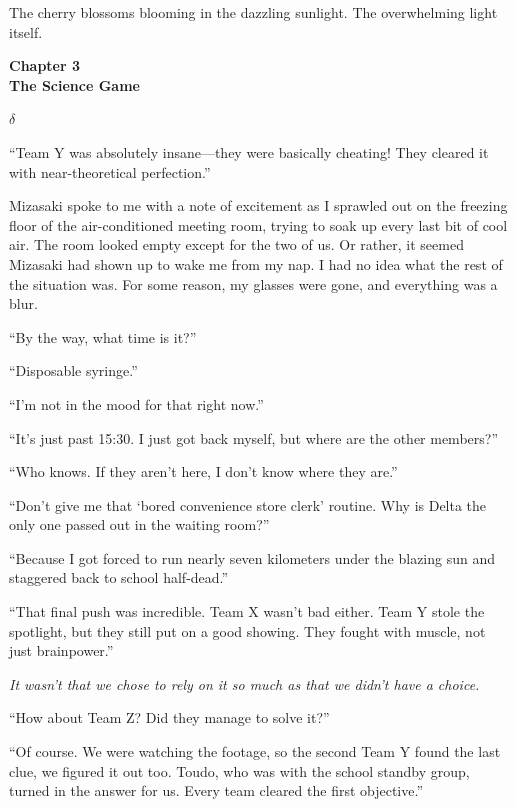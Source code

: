 \documentclass[
    a4paper,
    12pt,
    twoside,
    openany,
    UTF8,
    fontset=windows
]{ctexbook}
\begin{document}
The cherry blossoms blooming in the dazzling sunlight. The overwhelming light itself.

\clearpage
\thispagestyle{plain}
\begin{center}
    \large\bfseries
    Chapter 3\\
    The Science Game
\end{center}
\label{sec:ch3V3}
\vspace{1cm}

$\delta$

``Team Y was absolutely insane---they were basically cheating! They cleared it with near-theoretical perfection.''

Mizasaki spoke to me with a note of excitement as I sprawled out on the freezing floor of the air-conditioned meeting room, trying to soak up every last bit of cool air. The room looked empty except for the two of us. Or rather, it seemed Mizasaki had shown up to wake me from my nap. I had no idea what the rest of the situation was. For some reason, my glasses were gone, and everything was a blur.

``By the way, what time is it?''

``Disposable syringe.''

``I'm not in the mood for that right now.''

``It's just past 15:30. I just got back myself, but where are the other members?''

``Who knows. If they aren't here, I don't know where they are.''

``Don't give me that `bored convenience store clerk' routine. Why is Delta the only one passed out in the waiting room?''

``Because I got forced to run nearly seven kilometers under the blazing sun and staggered back to school half-dead.''

``That final push was incredible. Team X wasn't bad either. Team Y stole the spotlight, but they still put on a good showing. They fought with muscle, not just brainpower.''

\textit{It wasn't that we chose to rely on it so much as that we didn't have a choice.}

``How about Team Z? Did they manage to solve it?''

``Of course. We were watching the footage, so the second Team Y found the last clue, we figured it out too. Toudo, who was with the school standby group, turned in the answer for us. Every team cleared the first objective.''
\end{document}
